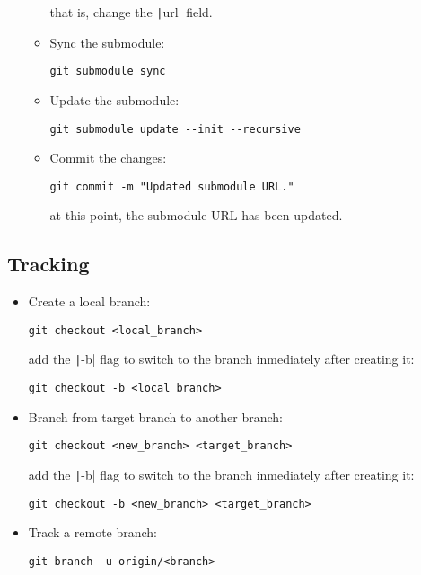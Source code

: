 \begin{itemize}
\begin{itemize}
        that is, change the \texttt|url| field.
        \item Sync the submodule:
        \begin{verbatim}
git submodule sync
        \end{verbatim}
        \item Update the submodule:
        \begin{verbatim}
git submodule update --init --recursive
        \end{verbatim}
        \item Commit the changes:
        \begin{verbatim}
git commit -m "Updated submodule URL."
        \end{verbatim}
        at this point, the submodule URL has been updated.
    \end{itemize}
\end{itemize}


\subsection{Tracking}

\begin{itemize}
    \item Create a local branch:
    \begin{verbatim}
git checkout <local_branch>
    \end{verbatim}
    add the \texttt|-b| flag to switch to the branch inmediately after creating it:
    \begin{verbatim}
git checkout -b <local_branch>
    \end{verbatim}
    \item Branch from target branch to another branch:
    \begin{verbatim}
git checkout <new_branch> <target_branch>
    \end{verbatim}
    add the \texttt|-b| flag to switch to the branch inmediately after creating it:
    \begin{verbatim}
git checkout -b <new_branch> <target_branch>
    \end{verbatim}
    \item Track a remote branch:
    \begin{verbatim}
git branch -u origin/<branch>
    \end{verbatim}
\end{itemize}
